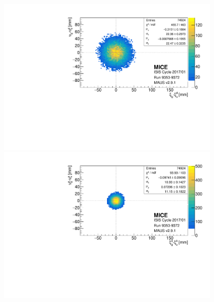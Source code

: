 \begin{figure} [!htb]
	\centering
	\begin{minipage}[b]{.475\textwidth}
		\centering
		\includegraphics[width=\textwidth]{data_test/tkd_xy_res.pdf}
	\end{minipage}
	\hfill
	\begin{minipage}[b]{.475\textwidth}
		\centering
		\includegraphics[width=\textwidth]{data_test/abs_xy_res.pdf}
	\end{minipage}
	

\end{figure}
